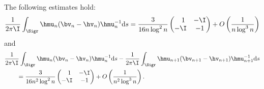 \begin{Proposition}\label{IntegralEst2Ap}
The following estimates hold:
\begin{align}\label{Int}
\frac{1}{2\pi\I} \int_{\Sigr} \hmu_n(\bv_n-\hv_n)\hmu_n^{-1} {\rm d}s = \frac{3}{16n \log^2n} \begin{pmatrix}
\phantom{-}1 & -\I\\
-\I & -1
\end{pmatrix} + O\left(\frac{1}{n\log^3 n}\right)
\end{align}
and
\begin{align}\nonumber
 & \frac{1}{2\pi\I} \int_{\Sigr} \hmu_n(\bv_n-\hv_n)\hmu_n^{-1} {\rm d}s - \frac{1}{2\pi\I} \int_{\Sigr} \hmu_{n+1}(\bv_{n+1}-\hv_{n+1})\hmu^{-1}_{n+1} {\rm d}s
 \\\label{differenceInt}
 &\qquad= \frac{3}{16n^2 \log^2n} \begin{pmatrix}
\phantom{-}1 & -\I\\
-\I & -1
\end{pmatrix} + O\left(\frac{1}{n^2\log^3 n}\right).
\end{align}
\end{Proposition}
